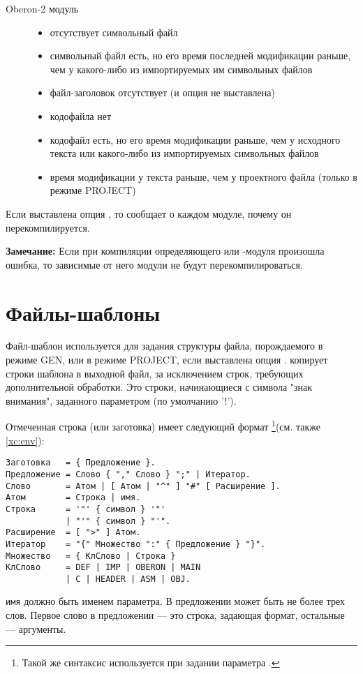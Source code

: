\begin{description}
\item[Oberon-2 модуль] \mbox{}

        \begin{itemize}
        \item отсутствует символьный файл
        \item символьный файл есть, но его время последней
          модификации раньше, чем у какого-либо
          из импортируемых им символьных файлов
        \ifgenc
          \item файл-заголовок отсутствует (и опция  
          не выставлена)
        \fi
        \item кодофайла нет
        \item кодофайл есть, но его время модификации раньше, чем у
          исходного текста или какого-либо из импортируемых
          символьных файлов
\ifcomment
        \item время модификации у текста раньше, чем у проектного файла
         (только в режиме PROJECT)
\fi
        \end{itemize}
\end{description}

Если выставлена опция , то \xds{} сообщает о каждом
модуле, почему он перекомпилируется.

{\bf  Замечание:} Если при компиляции определяющего или  
\ot{}-модуля произошла ошибка, то зависимые от него модули 
не будут перекомпилироваться.

\section{Файлы-шаблоны}\label{xc:template}

Файл-шаблон используется для задания структуры файла, порождаемого
в режиме GEN, или в режиме PROJECT, если выставлена опция
. \XDS{} копирует строки шаблона в выходной файл,
за исключением строк, требующих дополнительной обработки. Это строки,
начинающиеся с символа "знак внимания", заданного параметром
 (по умолчанию '!').

Отмеченная строка (или заготовка) имеет следующий формат
\footnote{Такой же синтаксис используется при задании параметра
.}(см. также \ref{xc:env}):
\begin{verbatim}
Заготовка   = { Предложение }.
Предложение = Слово { "," Слово } ";" | Итератор.
Слово       = Атом | [ Атом | "^" ] "#" [ Расширение ].
Атом        = Строка | имя.
Строка      = '"' { символ } '"'
            | "'" { символ } "'".
Расширение  = [ ">" ] Атом.
Итератор    = "{" Множество ":" { Предложение } "}".
Множество   = { КлСлово | Строка }
КлСлово     = DEF | IMP | OBERON | MAIN
            | C | HEADER | ASM | OBJ.
\end{verbatim}
{\tt имя} должно быть именем параметра. В предложении 
может быть не более трех слов. Первое слово в предложении --- это
строка, задающая формат, остальные --- аргументы.

